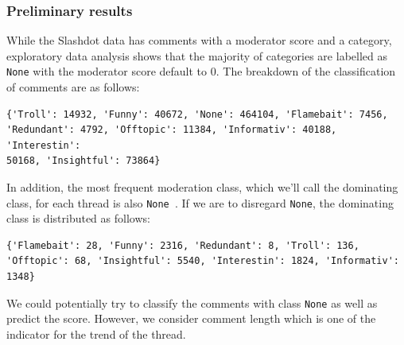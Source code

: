 \documentclass[a4paper,12pt]{article}
\numberwithin{equation}{section}
\begin{document}





\subsubsection*{Preliminary results}

While the Slashdot data has comments with a moderator score and a category, exploratory data analysis shows that the majority of categories are labelled as {\tt None} with the moderator score default to $0$. 
The breakdown of the classification of comments are as follows:
\vspace*{-0.5cm}
\begin{verbatim}
{'Troll': 14932, 'Funny': 40672, 'None': 464104, 'Flamebait': 7456, 
'Redundant': 4792, 'Offtopic': 11384, 'Informativ': 40188, 'Interestin': 
50168, 'Insightful': 73864}
\end{verbatim}
In addition, the most frequent moderation class, which we'll call the dominating class, for each thread is also {\tt None }. If we are to disregard {\tt None}, the dominating class is distributed as follows:

\vspace*{-0.5cm}
\begin{verbatim}
{'Flamebait': 28, 'Funny': 2316, 'Redundant': 8, 'Troll': 136, 
'Offtopic': 68, 'Insightful': 5540, 'Interestin': 1824, 'Informativ': 1348}
\end{verbatim}

We could potentially try to classify the comments with class {\tt None} as well as predict the score. However, we consider comment length which is one of the indicator for the trend of the thread.
\end{document}
